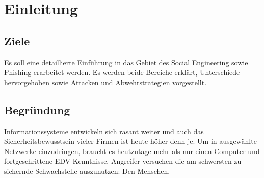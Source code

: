 \chapter{Einleitung}

\section{Ziele}
Es soll eine detaillierte Einführung in das Gebiet des Social Engineering sowie Phishing erarbeitet werden.
Es werden beide Bereiche erklärt, Unterschiede hervorgehoben sowie Attacken und Abwehrstrategien vorgestellt.

\section{Begründung}
Informationssysteme entwickeln sich rasant weiter und auch das Sicherheitsbewusstsein vieler Firmen ist heute höher denn je. Um in ausgewählte Netzwerke einzudringen, braucht es heutzutage mehr als nur einen Computer und fortgeschrittene EDV-Kenntnisse. Angreifer versuchen die am schwersten zu sichernde Schwachstelle auszunutzen: Den Menschen.

